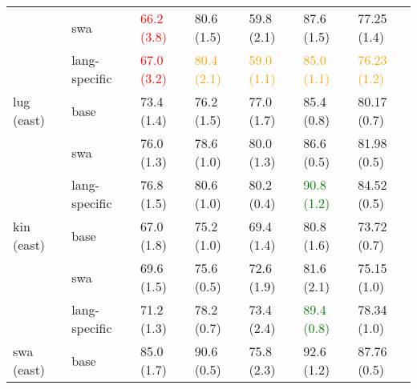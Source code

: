 \begin{tabular}{lllllll}
           & swa &                      \textcolor{red}{66.2 (3.8)} &                      80.6 (1.5) &                                       59.8 (2.1) &                                       87.6 (1.5) &                                       77.25 (1.4) \\
           & lang-specific &                      \textcolor{red}{67.0 (3.2)} &  \textcolor{orange}{80.4 (2.1)} &                   \textcolor{orange}{59.0 (1.1)} &                   \textcolor{orange}{85.0 (1.1)} &                   \textcolor{orange}{76.23 (1.2)} \\
\midrule
lug (east) & base &                                       73.4 (1.4) &                      76.2 (1.5) &                                       77.0 (1.7) &                                       85.4 (0.8) &                                       80.17 (0.7) \\
           & swa &                                       76.0 (1.3) &                      78.6 (1.0) &                                       80.0 (1.3) &                                       86.6 (0.5) &                                       81.98 (0.5) \\
           & lang-specific &                                       76.8 (1.5) &                      80.6 (1.0) &                                       80.2 (0.4) &                    \textcolor{green}{90.8 (1.2)} &                                       84.52 (0.5) \\
\midrule
kin (east) & base &                                       67.0 (1.8) &                      75.2 (1.0) &                                       69.4 (1.4) &                                       80.8 (1.6) &                                       73.72 (0.7) \\
           & swa &                                       69.6 (1.5) &                      75.6 (0.5) &                                       72.6 (1.9) &                                       81.6 (2.1) &                                       75.15 (1.0) \\
           & lang-specific &                                       71.2 (1.3) &                      78.2 (0.7) &                                       73.4 (2.4) &                    \textcolor{green}{89.4 (0.8)} &                                       78.34 (1.0) \\
\midrule
swa (east) & base &                                       85.0 (1.7) &                      90.6 (0.5) &                                       75.8 (2.3) &                                       92.6 (1.2) &                                       87.76 (0.5) \\

\end{tabular}

